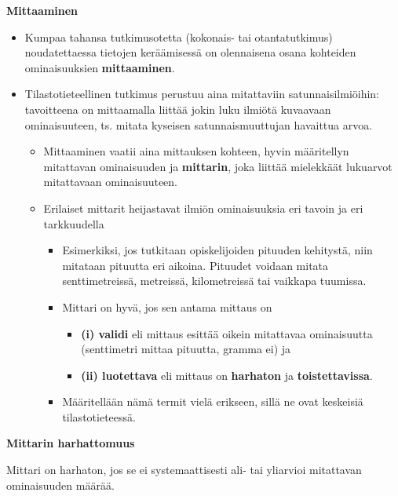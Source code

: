 \documentclass[
]{book}
\providecommand{\tightlist}{%
  \setlength{\itemsep}{0pt}\setlength{\parskip}{0pt}}
\begin{document}
\textbf{Mittaaminen}

\begin{itemize}
\tightlist
\item
  Kumpaa tahansa tutkimusotetta (kokonais- tai otantatutkimus) noudatettaessa tietojen keräämisessä on olennaisena osana kohteiden ominaisuuksien \textbf{mittaaminen}.
\item
  Tilastotieteellinen tutkimus perustuu aina mitattaviin satunnaisilmiöihin: tavoitteena on mittaamalla liittää jokin luku ilmiötä kuvaavaan ominaisuuteen, ts. mitata kyseisen satunnaismuuttujan havaittua arvoa.

  \begin{itemize}
  \tightlist
  \item
    Mittaaminen vaatii aina mittauksen kohteen, hyvin määritellyn mitattavan ominaisuuden ja \textbf{mittarin}, joka liittää mielekkäät lukuarvot mitattavaan ominaisuuteen.
  \item
    Erilaiset mittarit heijastavat ilmiön ominaisuuksia eri tavoin ja eri tarkkuudella

    \begin{itemize}
    \tightlist
    \item
      Esimerkiksi, jos tutkitaan opiskelijoiden pituuden kehitystä, niin mitataan pituutta eri aikoina. Pituudet voidaan mitata senttimetreissä, metreissä, kilometreissä tai vaikkapa tuumissa.
    \item
      Mittari on hyvä, jos sen antama mittaus on

      \begin{itemize}
      \tightlist
      \item
        \textbf{(i) validi} eli mittaus esittää oikein mitattavaa ominaisuutta (senttimetri mittaa pituutta, gramma ei) ja
      \item
        \textbf{(ii) luotettava} eli mittaus on \textbf{harhaton} ja \textbf{toistettavissa}.
      \end{itemize}
    \item
      Määritellään nämä termit vielä erikseen, sillä ne ovat keskeisiä tilastotieteessä.
    \end{itemize}
  \end{itemize}
\end{itemize}

\begin{defblock}{}
\textbf{Mittarin harhattomuus}

Mittari on harhaton, jos se ei systemaattisesti ali- tai yliarvioi mitattavan ominaisuuden määrää.

\end{defblock}
\end{document}
